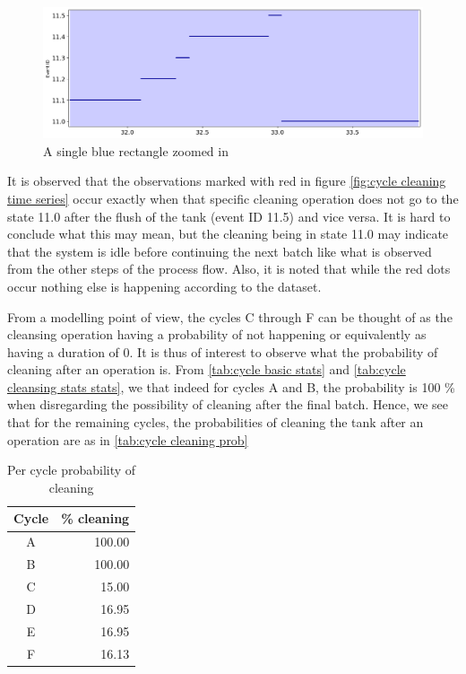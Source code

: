 \documentclass[../Thesis.tex]{subfiles}
\begin{document}
\begin{figure}[h]
    \centering
    \includegraphics[width=0.9\linewidth]{figures/Multiple cycles data/Cleaning batches timeseries single.png}
    \caption{A single blue rectangle zoomed in}
    \label{fig:cycle cleaning time series single}
\end{figure}

It is observed that the observations marked with red in figure \ref{fig:cycle cleaning time series} occur exactly when that specific cleaning operation does not go to the state 11.0 after the flush of the tank (event ID 11.5) and vice versa. It is hard to conclude what this may mean, but the cleaning being in state 11.0 may indicate that the system is idle before continuing the next batch like what is observed from the other steps of the process flow. Also, it is noted that while the red dots occur nothing else is happening according to the dataset.


From a modelling point of view, the cycles C through F can be thought of as the cleansing operation having a probability of not happening or equivalently as having a duration of 0. It is thus of interest to observe what the probability of cleaning after an operation is. From \autoref{tab:cycle basic stats} and \autoref{tab:cycle cleansing stats stats}, we that indeed for cycles A and B, the probability is 100 \% when disregarding the possibility of cleaning after the final batch. Hence, we see that for the remaining cycles, the probabilities of cleaning the tank after an operation are as in \autoref {tab:cycle cleaning prob}

\begin{table}[h]
    \centering
    \begin{tabular}{c|r}
        Cycle & \% cleaning \\ \hline
        A     & 100.00      \\
        B     & 100.00      \\
        C     & 15.00       \\
        D     & 16.95       \\
        E     & 16.95       \\
        F     & 16.13
    \end{tabular}
    \caption{Per cycle probability of cleaning}
    \label{tab:cycle cleaning prob}
\end{table}
\end{document}
